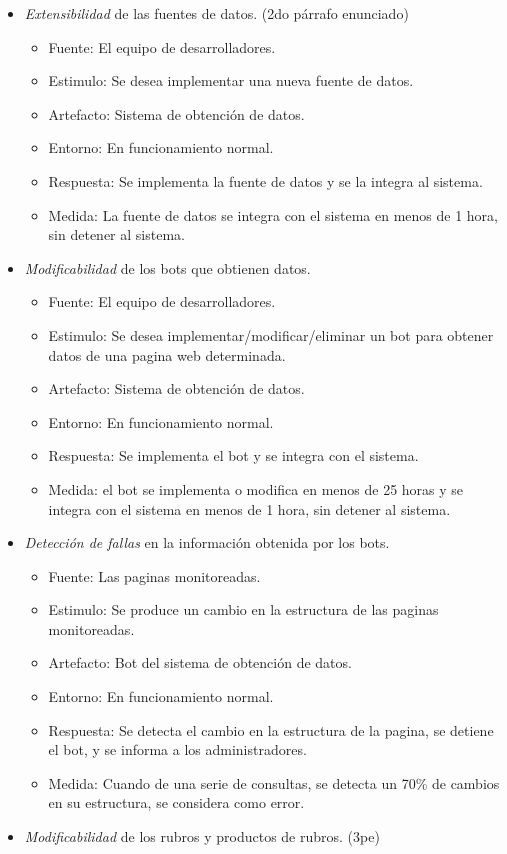 \begin{itemize}
\item
  \emph{Extensibilidad} de las fuentes de datos. (2do párrafo enunciado)

  \begin{itemize}
  \item
    Fuente: El equipo de desarrolladores.
  \item
    Estimulo: Se desea implementar una nueva fuente de datos.
  \item
    Artefacto: Sistema de obtención de datos.
  \item
    Entorno: En funcionamiento normal.
  \item
    Respuesta: Se implementa la fuente de datos y se la integra al
    sistema.
  \item
    Medida: La fuente de datos se integra con el sistema en menos de 1
    hora, sin detener al sistema.
  \end{itemize}
\item
  \emph{Modificabilidad} de los bots que obtienen datos.

  \begin{itemize}
  \item
    Fuente: El equipo de desarrolladores.
  \item
    Estimulo: Se desea implementar/modificar/eliminar un bot para
    obtener datos de una pagina web determinada.
  \item
    Artefacto: Sistema de obtención de datos.
  \item
    Entorno: En funcionamiento normal.
  \item
    Respuesta: Se implementa el bot y se integra con el sistema.
  \item
    Medida: el bot se implementa o modifica en menos de 25 horas y se
    integra con el sistema en menos de 1 hora, sin detener al sistema.
  \end{itemize}
\item
  \emph{Detección de fallas} en la información obtenida por los bots.

  \begin{itemize}
  \item
    Fuente: Las paginas monitoreadas.
  \item
    Estimulo: Se produce un cambio en la estructura de las paginas
    monitoreadas.
  \item
    Artefacto: Bot del sistema de obtención de datos.
  \item
    Entorno: En funcionamiento normal.
  \item
    Respuesta: Se detecta el cambio en la estructura de la pagina, se
    detiene el bot, y se informa a los administradores.
  \item
    Medida: Cuando de una serie de consultas, se detecta un 70\% de
    cambios en su estructura, se considera como error.
  \end{itemize}
\item
  \emph{Modificabilidad} de los rubros y productos de rubros. (3pe)


\end{itemize}
